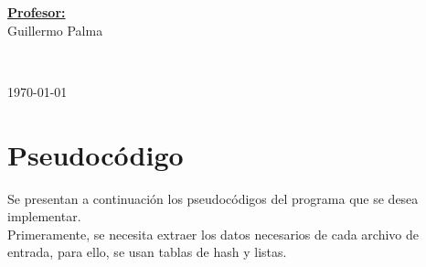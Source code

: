 \documentclass[11pt]{article}
\begin{document}
\begin{center}
   \begin{minipage}{\textwidth}    
      \vspace{-0.6cm}  
      \begin{flushright} \large    
         \textbf{\underline{Profesor:}} \\  
         Guillermo Palma  
      \end{flushright}        
   \end{minipage} 

   \vspace*{1cm}
   \\
   \vspace{2cm}  

   \begin{center} 
      {\large \today} 
   \end{center}     
\end{center}                                                      
                                                               
\newpage
                                                    

\section{Pseudocódigo}

Se presentan a continuación los pseudocódigos del programa que
se desea implementar. \\

Primeramente, se necesita extraer los datos necesarios de cada
archivo de entrada, para ello, se usan tablas de hash y listas.
\end{document}
